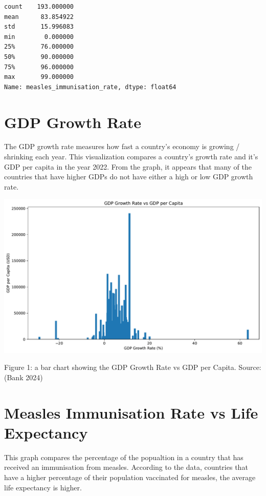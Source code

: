 \documentclass[
  letterpaper,
  DIV=11,
  numbers=noendperiod]{scrartcl}
\begin{document}
\begin{verbatim}
count    193.000000
mean      83.854922
std       15.996083
min        0.000000
25%       76.000000
50%       90.000000
75%       96.000000
max       99.000000
Name: measles_immunisation_rate, dtype: float64
\end{verbatim}

\section{GDP Growth Rate}\label{gdp-growth-rate}

The GDP growth rate measures how fast a country's economy is growing /
shrinking each year. This visualization compares a country's growth rate
and it's GDP per capita in the year 2022. From the graph, it appears
that many of the countries that have higher GDPs do not have either a
high or low GDP growth rate.

\includegraphics{assignment_05_files/figure-pdf/cell-6-output-1.pdf}

Figure 1: a bar chart showing the GDP Growth Rate vs GDP per Capita.
Source: (Bank 2024)

\section{Measles Immunisation Rate vs Life
Expectancy}\label{measles-immunisation-rate-vs-life-expectancy}

This graph compares the percentage of the popualtion in a country that
has received an immunisation from measles. According to the data,
countries that have a higher percentage of their population vaccinated
for measles, the average life expectancy is higher.
\end{document}
